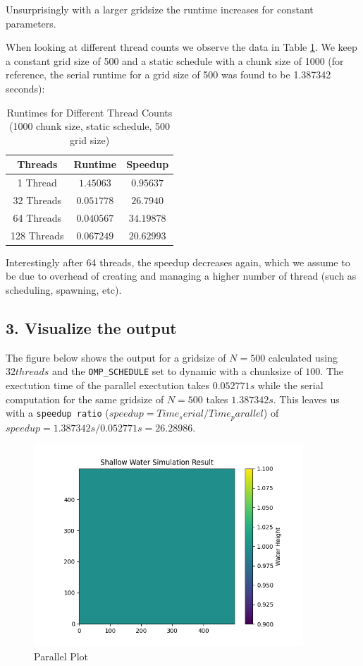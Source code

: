 \documentclass[a4paper,10pt]{article}
\begin{document}
Unsurprisingly with a larger gridsize the runtime increases for constant parameters.


When looking at different thread counts we observe the data in Table \ref{table:ex5_thread_changes}. We keep a constant grid size of 500 and a static schedule with a chunk size of 1000 (for reference, the serial runtime for a grid size of 500 was found to be 1.387342 seconds):
\begin{table}[h!]
\centering
\begin{tabular}{|c|c|c|}
\hline
\textbf{Threads} & \textbf{Runtime} & \textbf{Speedup} \\
\hline
1 Thread  & $1.45063$  & $0.95637$ \\
32 Threads & $0.051778$ & $26.7940$ \\
64 Threads & $0.040567$ & $34.19878$ \\
128 Threads & $0.067249$ & $20.62993$ \\
\hline
\end{tabular}
\caption{Runtimes for Different Thread Counts (1000 chunk size, static schedule, 500 grid size)}
\label{table:ex5_thread_changes}
\end{table}

Interestingly after 64 threads, the speedup decreases again, which we assume to be due to overhead of creating and managing a higher number of thread (such as scheduling, spawning, etc).

\subsection{3. Visualize the output}
The figure below shows the output for a gridsize of $N=500$ calculated using $32 threads$ and the \verb|OMP_SCHEDULE| set to dynamic with a 
chunksize of $ 100 $.
The exectution time of the parallel exectution takes $0.052771s$ while the serial computation for the same gridsize of $N=500$ takes $1.387342s$.  
This leaves us with a \verb|speedup ratio| ($speedup = Time_serial / Time_parallel$) of $speedup = 1.387342s/0.052771s = 26.28986 $. 


\begin{figure}[H]
  \centering
  \includegraphics[width=0.9\textwidth]{img/ex5/parallel_plot.png}
  \caption{Parallel Plot}
  \label{fig:ex5_parallel}
\end{figure}
\end{document}
